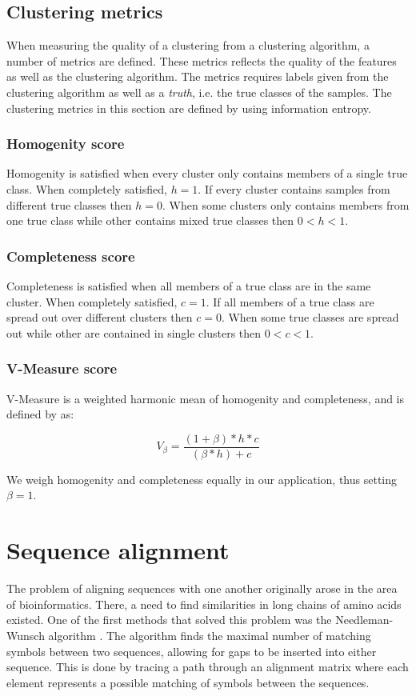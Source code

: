 \documentclass[a4paper]{report}
\begin{document}
\subsection{Clustering metrics}
\label{sec:metrics}
When measuring the quality of a clustering from a clustering algorithm, a
number of metrics are defined. These metrics reflects the quality of the
features as well as the clustering algorithm. The metrics requires labels
given from the clustering algorithm as well as a \emph{truth}, i.e. the true
classes of the samples. The clustering metrics in this section are defined
by \citet{rosenberg07} using information entropy.

\subsubsection{Homogenity score}
Homogenity is satisfied when every cluster only contains members of a single
true class. When completely satisfied, $h = 1$. If every cluster contains
samples from different true classes then $h = 0$. When some clusters only
contains members from one true class while other contains mixed true classes
then $0 < h < 1$.

\subsubsection{Completeness score}
Completeness is satisfied when all members of a true class are in the same
cluster. When completely satisfied, $c = 1$. If all members of a true class
are spread out over different clusters then $c = 0$. When some true classes
are spread out while other are contained in single clusters then
$0 < c < 1$.

\subsubsection{V-Measure score}
V-Measure is a weighted harmonic mean of homogenity and completeness, and
is defined by \citeauthor{rosenberg07} as:

\[
    V_{\beta} = \frac{(1 + \beta) * h * c}{(\beta * h) + c}
\]

We weigh homogenity and completeness equally in our application, thus setting
$\beta = 1$.

\section{Sequence alignment}
The problem of aligning sequences with one another originally arose in the area
of bioinformatics. There, a need to find similarities in long chains of amino
acids existed. One of the first methods that solved this problem was the
Needleman-Wunsch algorithm \citep{needleman70}. The algorithm finds the maximal
number of matching symbols between two sequences, allowing for gaps to be
inserted into either sequence. This is done by tracing a path through an
alignment matrix where each element represents a possible matching of symbols
between the sequences.
\end{document}
